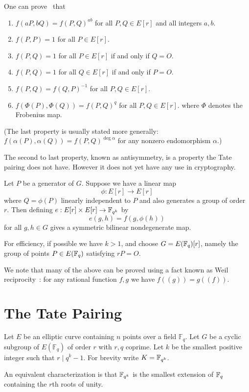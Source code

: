 One can prove~\cite{silverman} that
\begin{enumerate}
\item
$f(a P, b Q) = f(P,Q)^{a b}$ for all $P, Q \in E[r]$ and all integers $a, b$.
\item
$f(P,P) = 1$ for all $P \in E[r]$.
\item
$f(P,Q) = 1$ for all $P \in E[r]$ if and only if $Q = O$.
\item
$f(P,Q) = 1$ for all $Q \in E[r]$ if and only if $P = O$.
\item
$f(P,Q) = f(Q,P)^{-1}$ for all $P,Q \in E[r]$.
\item
$f(\Phi(P),\Phi(Q)) = f(P,Q)^{q}$ for all $P,Q \in E[r]$.
where $\Phi$ denotes the Frobenius map.
\end{enumerate}

(The last property is usually stated more generally:
$f(\alpha(P),\alpha(Q)) = f(P,Q)^{\deg \alpha}$ for any nonzero
endomorphism $\alpha$.)

The second to last property, known as antisymmetry, is a property the
Tate pairing does not have. However it does not yet have
any use in cryptography.

Let $P$ be a generator of $G$. Suppose
we have a linear map
\[ \phi : E[r] \rightarrow E[r] \]
where $Q = \phi(P)$ linearly independent to $P$ and also generates
a group of order $r$.
Then defining $e:E[r]\times E[r]\rightarrow \mathbb{F}_{q^k}$ by
\[ e(g,h) = f(g,\phi(h)) \]
for all $g, h \in G$
gives a symmetric bilinear nondegenerate map.

For efficiency, if possible we have $k > 1$, and choose
$G = E(\mathbb{F}_q)[r]$, namely the
group of points $P \in E(\mathbb{F}_q)$ satisfying $r P = O$.

We note that many of the above can be proved
using a fact known as Weil reciprocity~\cite{bf}:
for any rational function $f, g$
we have $f((g)) = g((f))$.

\section {The Tate Pairing }

Let $E$ be an elliptic curve containing $n$ points over a field $\mathbb{F}_q$.
Let $G$ be a cyclic subgroup of $E(\mathbb{F}_q)$ of order $r$ with $r, q$
coprime. Let $k$ be the smallest positive integer such that $r \mid q^k - 1$.
For brevity write $K = \mathbb{F}_{q^k}$.

An equivalent characterization is that
$\mathbb{F}_{q^k}$ is the smallest extension of $\mathbb{F}_q$ containing the $r$th roots of unity.

